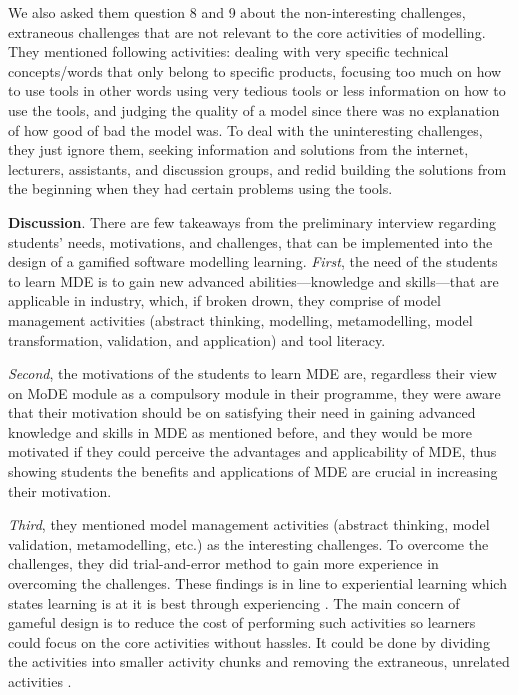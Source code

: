 \documentclass[12pt, a4paper]{report}
\begin{document}
We also asked them question 8 and 9 about the non-interesting challenges, extraneous challenges that are not relevant to the core activities of modelling. They mentioned following activities: dealing with very specific technical concepts/words that only belong to specific products, focusing too much on how to use tools in other words using very tedious tools or less information on how to use the tools, and judging the quality of a model since there was no explanation of how good of bad the model was. To deal with the uninteresting challenges, they just ignore them, seeking information and solutions from the internet, lecturers, assistants, and discussion groups, and redid building the solutions from the beginning when they had certain problems using the tools.

\textbf{Discussion}. There are few takeaways from the preliminary interview regarding students' needs, motivations, and challenges, that can be implemented into the design of a gamified software modelling learning. \textit{First}, the need of the students to learn MDE is to gain new advanced abilities---knowledge and skills---that are applicable in industry, which, if broken drown, they comprise of model management activities (abstract thinking, modelling, metamodelling, model transformation, validation, and application) and tool literacy. 

\textit{Second}, the motivations of the students to learn MDE are, regardless their view on MoDE module as a compulsory module in their programme, they were aware that their motivation should be on satisfying their need in gaining advanced knowledge and skills in MDE as mentioned before, and they would be more motivated if they could perceive the advantages and applicability of MDE, thus showing students the benefits and applications of MDE are crucial in increasing their motivation.

\textit{Third}, they mentioned model management activities (abstract thinking, model validation, metamodelling, etc.) as the interesting challenges. To overcome the challenges, they did trial-and-error method to gain more experience in overcoming the challenges. These findings is in line to experiential learning which states learning is at it is best through experiencing \cite{kolb2014experiential}. The main concern of gameful design is to reduce the cost of performing such activities so learners could focus on the core activities without hassles. It could be done by dividing the activities into smaller activity chunks and removing the extraneous, unrelated activities \cite{deterding2015lens}. 
\end{document}
